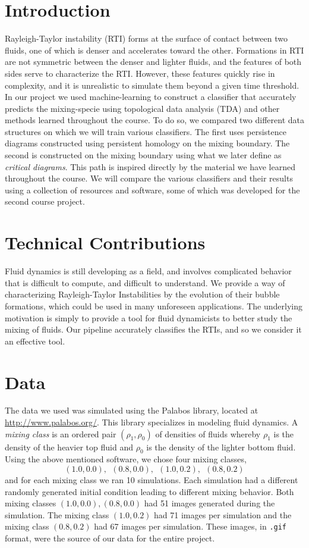 \documentclass[12pt, fullpage,letterpaper]{article}
\theoremstyle{definition}
\begin{document}
	\section*{\normalfont Introduction}
	Rayleigh-Taylor instability (RTI) forms at the surface of contact between two fluids, one of which is denser and accelerates toward the other. Formations in RTI are not symmetric between the denser and lighter fluids, and the features of both sides serve to characterize the RTI. However, these features quickly rise in complexity, and it is unrealistic to simulate them beyond a given time threshold. In our project we used machine-learning to construct a classifier that accurately predicts the mixing-specie using topological data analysis (TDA) and other methods learned throughout the course. To do so, we compared two different data structures on which we will train various classifiers. The first uses persistence diagrams constructed using persistent homology on the mixing boundary. The second is constructed on the mixing boundary using what we later define as \emph{critical diagrams}. This path is inspired directly by the material we have learned throughout the course. We will compare the various classifiers and their results using a collection of resources and software, some of which was developed for the second course project.
	
	\section*{\normalfont Technical Contributions}
	Fluid dynamics is still developing as a field, and involves complicated behavior that is difficult to compute, and difficult to understand. We provide a way of characterizing Rayleigh-Taylor Instabilities by the evolution of their bubble formations, which could be used in many unforeseen applications. The underlying motivation is simply to provide a tool for fluid dynamicists to better study the mixing of fluids. Our pipeline accurately classifies the RTIs, and so we consider it an effective tool.
	
	\section*{\normalfont Data}
	The data we used was simulated using the Palabos library, located at \url{http://www.palabos.org/}. This library specializes in modeling fluid dynamics. A \emph{mixing class} is an ordered pair $(\rho_1, \rho_0)$ of densities of fluids whereby $\rho_1$ is the density of the heavier top fluid and $\rho_0$ is the density of the lighter bottom fluid. Using the above mentioned software, we chose four mixing classes, 
	$$
		(1.0, 0.0), \ \ (0.8, 0.0), \ \ (1.0, 0.2), \ \ (0.8, 0.2)
	$$
	and for each mixing class we ran 10 simulations. Each simulation had a different randomly generated initial condition leading to different mixing behavior. Both mixing classes $(1.0, 0.0), (0.8, 0.0)$ had 51 images generated during the simulation. The mixing class $(1.0, 0.2)$ had 71 images per simulation and the mixing class $(0.8, 0.2)$ had 67 images per simulation. These images, in \texttt{.gif} format, were the source of our data for the entire project. 
	
\end{document}
